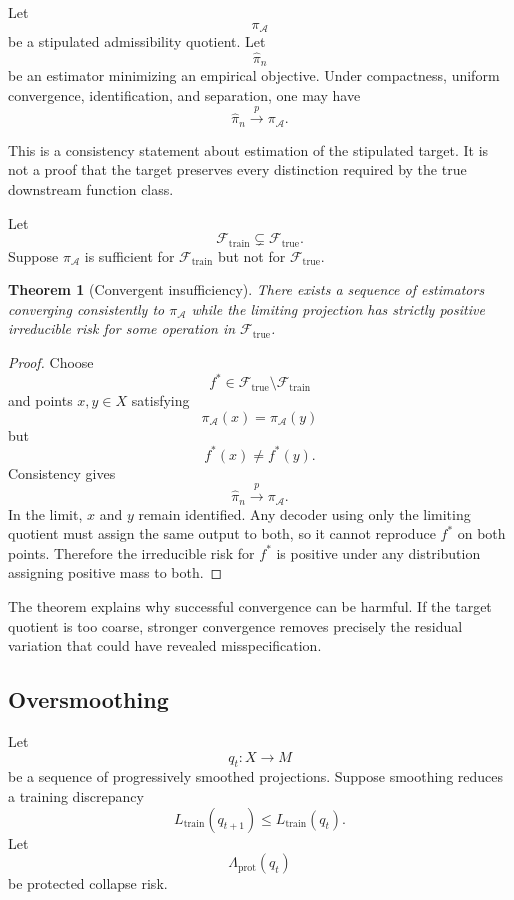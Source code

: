 \documentclass[11pt]{article}
\newtheorem{theorem}[definition]{Theorem}
\theoremstyle{definition}
\newcommand{\F}{\mathcal{F}}
\begin{document}
Let
\[
\pi_{\mathcal A}
\]
be a stipulated admissibility quotient. Let
\[
\widehat\pi_n
\]
be an estimator minimizing an empirical objective. Under compactness, uniform convergence, identification, and separation, one may have
\[
\widehat\pi_n
\xrightarrow{p}
\pi_{\mathcal A}.
\]

This is a consistency statement about estimation of the stipulated target. It is not a proof that the target preserves every distinction required by the true downstream function class.

Let
\[
\F_{\mathrm{train}}
\subsetneq
\F_{\mathrm{true}}.
\]
Suppose \(\pi_{\mathcal A}\) is sufficient for \(\F_{\mathrm{train}}\) but not for \(\F_{\mathrm{true}}\).

\begin{theorem}[Convergent insufficiency]
There exists a sequence of estimators converging consistently to \(\pi_{\mathcal A}\) while the limiting projection has strictly positive irreducible risk for some operation in \(\F_{\mathrm{true}}\).
\end{theorem}

\begin{proof}
Choose
\[
f^{*}\in
\F_{\mathrm{true}}\setminus
\F_{\mathrm{train}}
\]
and points \(x,y\in X\) satisfying
\[
\pi_{\mathcal A}(x)
=
\pi_{\mathcal A}(y)
\]
but
\[
f^{*}(x)\neq f^{*}(y).
\]
Consistency gives
\[
\widehat\pi_n
\xrightarrow{p}
\pi_{\mathcal A}.
\]
In the limit, \(x\) and \(y\) remain identified. Any decoder using only the limiting quotient must assign the same output to both, so it cannot reproduce \(f^{*}\) on both points. Therefore the irreducible risk for \(f^{*}\) is positive under any distribution assigning positive mass to both.
\end{proof}

The theorem explains why successful convergence can be harmful. If the target quotient is too coarse, stronger convergence removes precisely the residual variation that could have revealed misspecification.

\subsection{Oversmoothing}

Let
\[
q_t:X\to M
\]
be a sequence of progressively smoothed projections. Suppose smoothing reduces a training discrepancy
\[
L_{\mathrm{train}}(q_{t+1})
\leq
L_{\mathrm{train}}(q_t).
\]
Let
\[
\Lambda_{\mathrm{prot}}(q_t)
\]
be protected collapse risk.
\end{document}
